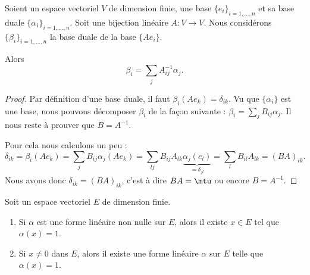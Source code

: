 \begin{lemma}		\label{LEMooSVRIooFbxfue}
	Soient un espace vectoriel \( V\) de dimension finie, une base \( \{ e_i \}_{i=1,\ldots,n}\) et sa base duale \( \{ \alpha_i \}_{i=1,\ldots,n}\). Soit une bijection linéaire \(A \colon V\to V  \). Nous considérons \( \{ \beta_i \}_{i=1,\ldots,n}\) la base duale de la base \( \{ Ae_i \}\).

	Alors
	\begin{equation}
		\beta_i=\sum_jA^{-1}_{ij}\alpha_j.
	\end{equation}
\end{lemma}

\begin{proof}

	Par définition d'une base duale, il faut \( \beta_i(Ae_k)=\delta_{ik}\). Vu que \( \{ \alpha_i \}\) est une base, nous pouvons décomposer \( \beta_i\) de la façon suivante : \( \beta_i=\sum_jB_{ij}\alpha_j\). Il nous reste à prouver que \( B=A^{-1}\).

	Pour cela nous calculons un peu :
	\begin{equation}
		\delta_{ik}=\beta_i(Ae_k)=\sum_jB_{ij}\alpha_j(Ae_k)=\sum_{lj}B_{ij}A_{lk}\underbrace{\alpha_j(e_l)}_{=\delta_{jl}}=\sum_lB_{il}A_{lk}=(BA)_{ik}.
	\end{equation}
	Nous avons donc \( \delta_{ik}=(BA)_{ik}\), c'est à dire \( BA=\mtu\) ou encore \( B=A^{-1}\).
\end{proof}

\begin{lemma}           \label{LEMooQLWNooYUpGdo}
	Soit un espace vectoriel \( E\) de dimension finie.
	\begin{enumerate}
		\item       \label{ITEMooHHTLooNCjgfn}
		      Si \( \alpha\) est une forme linéaire non nulle sur \( E\), alors il existe \( x\in E\) tel que \( \alpha(x)=1\).
		\item       \label{ITEMooBYAAooUWBKDk}
		      Si \( x\neq 0\) dans \( E\), alors il existe une forme linéaire \( \alpha\) sur \( E\) telle que \( \alpha(x)=1\).
	\end{enumerate}
\end{lemma}

